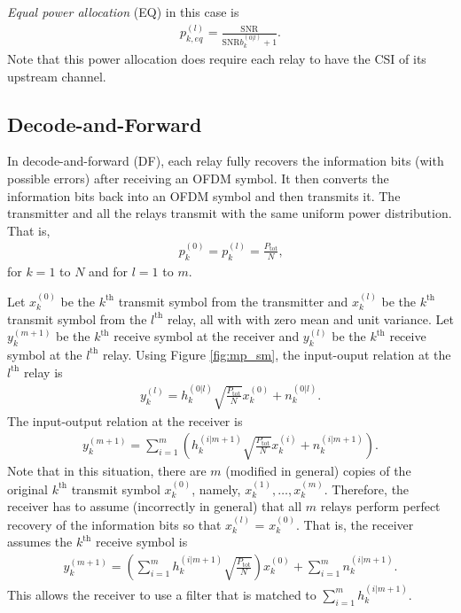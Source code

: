 \documentclass[conference]{IEEEtran}
\begin{document}
\emph{Equal power allocation} (EQ) in this case is
\begin{eqnarray}
p_{k,eq}^{(l)} =  \frac{ \mbox{SNR}}
{\displaystyle  \mbox{SNR} b_k^{(0|l)} + 1} \mbox{.}
\end{eqnarray}
Note that this power allocation does require each relay to have the CSI of its upstream channel.

\subsection{Decode-and-Forward}
In decode-and-forward (DF), each relay fully recovers the information bits (with possible errors) after receiving an OFDM symbol.  It then converts the information bits back into an OFDM symbol and then transmits it.  The transmitter and all the relays transmit with the same uniform power distribution.  That is,
\begin{eqnarray}
p_k^{(0)} = p_k^{(l)} = \frac{P_{\mbox{tot}}}{N}\mbox{,}
\end{eqnarray}
for $k = 1$ to $N$ and for $l = 1$ to $m$.

Let $x_k^{(0)}$ be the $k^{\mbox{th}}$ transmit symbol from the transmitter and  $x_k^{(l)}$ be the $k^{\mbox{th}}$ transmit symbol from the $l^{\mbox{th}}$ relay, all with with zero mean and unit variance.  Let $y_k^{(m+1)}$ be the $k^{\mbox{th}}$ receive symbol at the receiver and  $y_k^{(l)}$ be the $k^{\mbox{th}}$ receive symbol at the $l^{\mbox{th}}$ relay.  Using Figure \ref{fig:mp_sm}, the input-ouput relation at the $l^{\mbox{th}}$ relay is
\begin{eqnarray}
y_k^{(l)} = h_k^{(0|l)} \sqrt{\frac{P_{\mbox{tot}}}{N}} x_k^{(0)} + n_k^{(0|l)} \mbox{.}
\end{eqnarray}
The input-output relation at the receiver is
\begin{eqnarray}
y_k^{(m+1)} = \sum_{i=1}^m\left( h_k^{(i|m+1)}  \sqrt{\frac{P_{\mbox{tot}}}{N}} x_k^{(i)} + n_k^{(i|m+1)} \right)\mbox{.}
\end{eqnarray}
Note that in this situation, there are $m$ (modified in general) copies of the original $k^{\mbox{th}}$ transmit symbol $x_k^{(0)}$, namely, $x_k^{(1)}, \ldots, x_k^{(m)}$.  Therefore, the receiver has to assume (incorrectly in general) that all $m$ relays perform perfect recovery of the information bits so that $x_k^{(l)}$ = $x_k^{(0)}$.  That is, the receiver assumes the $k^{\mbox{th}}$ receive symbol is
\begin{eqnarray}
y_k^{(m+1)} = \left( \sum_{i=1}^m h_k^{(i|m+1)}
\sqrt{\frac{P_{\mbox{tot}}}{N}} \right) x_k^{(0)} + \sum_{i=1}^m
n_k^{(i|m+1)} \mbox{.}
\end{eqnarray}
This allows the receiver to use a filter that is matched to $\displaystyle \sum_{i=1}^m h_k^{(i|m+1)}$.
\end{document}
